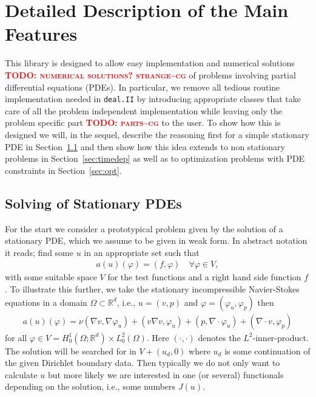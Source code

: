 \documentclass[prodmode,acmtoms]{acmsmall}
\numberwithin{equation}{section}
\newcommand{\R}{\mathbb{R}}
\renewcommand{\phi}{\varphi}
\newcommand{\deal}{\texttt{deal.II}}
\newcommand{\todocg}[1]{\textbf{\textsc{\textcolor{red}{TODO: #1\textasciitilde cg}}}}
\begin{document}
\section{Detailed Description of the Main Features}
\label{detailed_description}
This library is designed to allow easy implementation and numerical solutions \todocg{numerical solutions? strange} 
of problems involving partial differential equations (PDEs). 
In particular, we remove all tedious routine implementation needed in 
\deal{} by introducing appropriate classes that take care of all the 
problem independent implementation while leaving only the problem specific 
part \todocg{parts} to the user. To show how this is designed we will, in the sequel, 
describe the reasoning first for a simple stationary PDE in 
Section~\ref{subsubsec:stationary problems} and then show
how this idea extends to non stationary problems in 
Section~\ref{sec:timedep} as well as to optimization
problems with PDE constraints in Section~\ref{sec:opt}. 

\subsection{Solving of Stationary PDEs}
\label{subsubsec:stationary problems}
For the start we consider a prototypical problem given by the solution of 
a stationary PDE, which we assume to be given in weak form.
In abstract notation it reads; find some $u$ in an appropriate set
such that
\begin{align}\label{eq:prototype_weak}
a(u)(\phi) = (f,\phi) \quad \forall \phi \in V,
\end{align}
with some suitable space $V$ for the test functions and a 
right hand side function $f$.
To illustrate this further, we take the stationary 
incompressible Navier-Stokes equations in a domain $\Omega \subset \R^d$, 
i.e., $u = (v,p)$ and $\phi = (\phi_u,\phi_p)$ then
\begin{align}\label{eq:ns}
a(u)(\phi) = \nu(\nabla v, \nabla\phi_u) + (v \nabla v,\phi_u) + (p, \nabla \cdot \phi_u) + (\nabla \cdot v ,\phi_p)
\end{align}
for all $\phi \in V = H^1_0(\Omega;\R^d) \times L^2_0(\Omega)$.
Here $(\cdot,\cdot)$ denotes the $L^2$-inner-product.
The solution will be searched for in $V + (u_d,0)$ where $u_d$ is some 
continuation of the given Dirichlet boundary data.
Then typically we do not only want to calculate $u$ but more likely we are 
interested in one (or several) functionals depending on the solution, i.e., some numbers $J(u)$.
\end{document}
